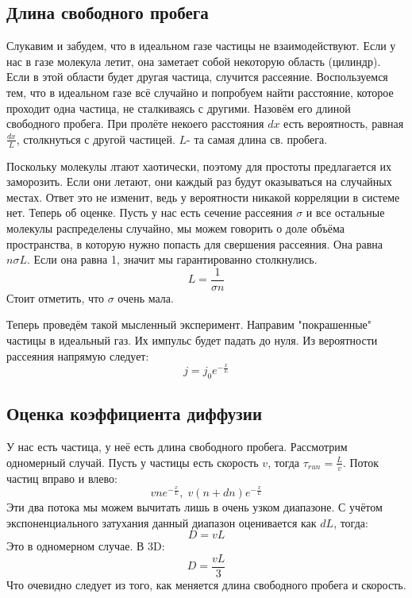 \documentclass[a4paper, 12pt]{article}
\begin{document}
	\subsection{Длина свободного пробега}
	Слукавим и забудем, что в идеальном газе частицы не взаимодействуют. Если у нас в газе молекула летит, она заметает собой некоторую область (цилиндр). Если в этой области будет другая частица, случится рассеяние. Воспользуемся тем, что в идеальном газе всё случайно и попробуем найти расстояние, которое проходит одна частица, не сталкиваясь с другими. Назовём его длиной свободного пробега. При пролёте некоего расстояния $dx$ есть вероятность, равная $\frac{dx}{L}$, столкнуться с другой частицей. $L $- та самая длина св. пробега. 
	
	Поскольку молекулы лтают хаотически, поэтому для простоты предлагается их заморозить. Если они летают, они каждый раз будут оказываться на случайных местах. Ответ это не изменит, ведь у вероятности никакой корреляции в системе нет. Теперь об оценке. Пусть у нас есть сечение рассеяния $\sigma$ и все остальные молекулы распределены случайно, мы можем говорить о доле объёма пространства, в которую нужно попасть для свершения рассеяния. Она равна $n \sigma L$. Если она равна 1, значит мы гарантированно столкнулись.
	\begin{equation*}
		L = \frac{1}{\sigma n}
	\end{equation*}
	Стоит отметить, что $\sigma$ очень мала. 
	
	Теперь проведём такой мысленный эксперимент. Направим "покрашенные" частицы в идеальный газ. Их импульс будет падать до нуля. Из вероятности рассеяния напрямую следует:
	\begin{equation*}
		j = j_{0} e^{-\frac{x}{L}}
	\end{equation*}
	\subsection{Оценка коэффициента диффузии}
	У нас есть частица, у неё есть длина свободного пробега. Рассмотрим одномерный случай. Пусть у частицы есть скорость $v$, тогда $\tau_{run} = \frac{L}{v}$. Поток частиц вправо и влево:
	\begin{equation*}
		vne^{-\frac{x}{L}} ,\; v(n+dn)e^{-\frac{x}{L}}
	\end{equation*}
	Эти два потока мы можем вычитать лишь в очень узком диапазоне. С учётом экспоненциального затухания данный диапазон оценивается как $dL$, тогда:
	\begin{equation*}
		D = vL
	\end{equation*}
	Это в одномерном случае. В 3D:
	\begin{equation*}
		D = \frac{vL}{3}
	\end{equation*}
	Что очевидно следует из того, как меняется длина свободного пробега и скорость.
\end{document}

